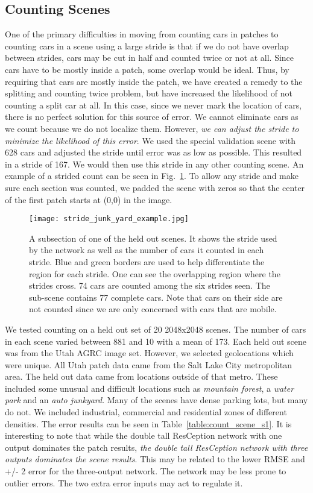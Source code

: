 \documentclass[runningheads]{llncs}
\begin{document}
\subsection{Counting Scenes}
One of the primary difficulties in moving from counting cars in patches to counting cars in a scene using a large stride is that if we do not have overlap between strides, cars may be cut in half and counted twice or not at all. Since cars have to be mostly inside a patch, some overlap would be ideal. Thus, by requiring that cars are mostly inside the patch, we have created a remedy to the splitting and counting twice problem, but have increased the likelihood of not counting a split car at all. In this case, since we never mark the location of cars, there is no perfect solution for this source of error. We cannot eliminate cars as we count because we do not localize them. However, {\it we can adjust the stride to minimize the likelihood of this error}. We used the special validation scene with 628 cars and adjusted the stride until error was as low as possible. This resulted in a stride of 167. We would then use this stride in any other counting scene. An example of a strided count can be seen in Fig.~\ref{fig:stride}. To allow any stride and make sure each section was counted, we padded the scene with zeros so that the center of the first patch starts at (0,0) in the image.

\begin{figure}
\centering
\texttt{[image: stride\_junk\_yard\_example.jpg]}
\caption{A subsection of one of the held out scenes. It shows the stride used by the network as well as the number of cars it counted in each stride. Blue and green borders are used to help differentiate the region for each stride. One can see the overlapping region where the strides cross. 74 cars are counted among the six strides seen. The sub-scene contains 77 complete cars. Note that cars on their side are not counted since we are only concerned with cars that are mobile. }
\label{fig:stride}
\end{figure}

We tested counting on a held out set of 20 2048x2048 scenes. The number of cars in each scene varied between 881 and 10 with a mean of 173. Each held out scene was from the Utah AGRC image set. However, we selected geolocations which were unique. All Utah patch data came from the Salt Lake City metropolitan area. The held out data came from locations outside of that metro. These included some unusual and difficult locations such as {\it mountain forest}, a {\it water park} and an {\it auto junkyard}. Many of the scenes have dense parking lots, but many do not. We included industrial, commercial and residential zones of different densities. The error results can be seen in Table~\ref{table:count_scene_s1}. It is interesting to note that while the double tall ResCeption network with one output dominates the patch results, {\it the double tall ResCeption network with three outputs dominates the scene results}. This may be related to the lower RMSE and +/- 2 error for the three-output network. The network may be less prone to outlier errors. The two extra error inputs may act to regulate it.  
\end{document}
